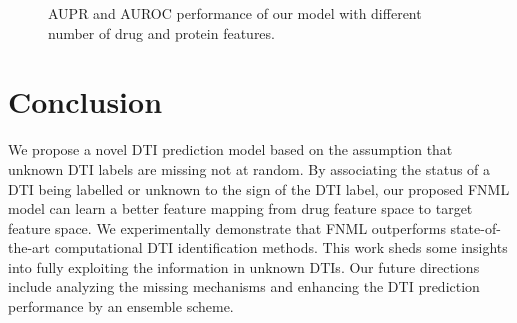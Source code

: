 \documentclass[conference]{IEEEtran}
\begin{document}
\begin{figure}[!ht]
\centering
{}
\vspace*{-10pt}
\caption{AUPR and AUROC performance of our model with different number of drug and protein features.}\label{fig:parameter}
\end{figure}


\section{Conclusion}\label{sec:conclusion}

We propose a novel DTI prediction model based on the assumption that unknown DTI labels are missing not at random. By associating the status of a DTI being labelled or unknown to the sign of the DTI label, our proposed FNML model can learn a better feature mapping from drug feature space to target feature space. We experimentally demonstrate that FNML outperforms state-of-the-art computational DTI identification methods. This work sheds some insights into fully exploiting the information in unknown DTIs. Our future directions include analyzing the missing mechanisms and enhancing the DTI prediction performance by an ensemble scheme.
\end{document}

